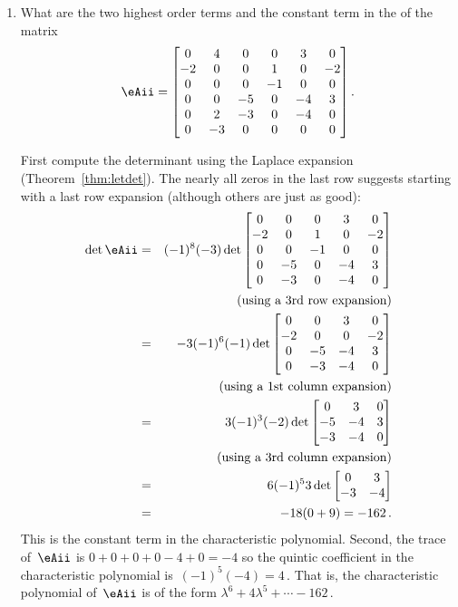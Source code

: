 \begin{example}
\begin{enumerate}
\item What are the two highest order terms and the constant term in the  of the matrix
\begin{equation*}
\eAii=\begin{bmatrix}0&4&0&0&3&0
\\-2&0&0&1&0&-2
\\0&0&0&-1&0&0
\\0&0&-5&0&-4&3
\\0&2&-3&0&-4&0
\\0&-3&0&0&0&0\end{bmatrix}.
\end{equation*}
\begin{solution} 
First compute the determinant using the Laplace expansion (Theorem~\ref{thm:letdet}).  
The nearly all zeros in the last row suggests starting with a last row expansion (although others are just as good):
\begin{eqnarray*}
\det \eAii&=&(-1)^8(-3)\det\begin{bmatrix}0&0&0&3&0
\\-2&0&1&0&-2
\\0&0&-1&0&0
\\0&-5&0&-4&3
\\0&-3&0&-4&0\end{bmatrix}
\\&&(\text{using a 3rd row expansion})
\\&=&-3(-1)^6(-1)\det\begin{bmatrix}0&0&3&0
\\-2&0&0&-2
\\0&-5&-4&3
\\0&-3&-4&0\end{bmatrix}
\\&&(\text{using a 1st column expansion})
\\&=&3(-1)^3(-2)\det\begin{bmatrix}0&3&0
\\-5&-4&3
\\-3&-4&0\end{bmatrix}
\\&&(\text{using a 3rd column expansion})
\\&=&6(-1)^53\det\begin{bmatrix}0&3
\\-3&-4\end{bmatrix}
\\&=&-18(0+9)=-162\,.
\end{eqnarray*}
This is the constant term in the characteristic polynomial.
Second, the trace of~\(\eAii\) is \(0+0+0+0-4+0=-4\) so the quintic coefficient in the characteristic polynomial is~\((-1)^5(-4)=4\)\,.
That is, the characteristic polynomial of~\(\eAii\) is of the form \(\lambda^6+4\lambda^5+\cdots-162\)\,.
\end{solution}

\end{enumerate}
\end{example}






